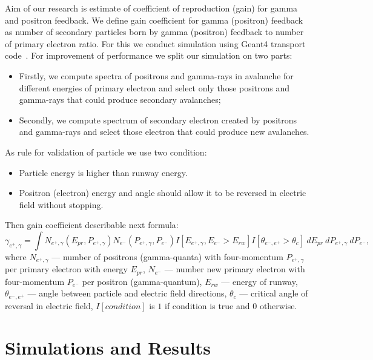 \documentclass{webofc}
\begin{document}
    
    Aim of our research is estimate of coefficient of reproduction (gain) for gamma and positron feedback. We define gain coefficient for gamma (positron) feedback as number of secondary particles born by gamma (positron) feedback to number of primary electron  ratio. For this we conduct simulation using Geant4 transport code~\cite{ALLISON2016186}. For improvement of performance we split our simulation on two parts:
    \begin{itemize}
        \item Firstly, we compute spectra of positrons and gamma-rays in avalanche for different energies of primary electron and select only those positrons and gamma-rays that could produce secondary avalanches;
        \item Secondly, we compute spectrum of secondary electron created by positrons and gamma-rays and select those electron that could produce new avalanches.
    \end{itemize}
    As rule for validation of particle we use two condition:
    \begin{itemize}
        \item Particle energy is higher than runway energy.
        \item Positron (electron) energy and angle should allow it to be reversed in electric field without stopping.
    \end{itemize}
    Then gain coefficient describable next formula:
    \begin{equation}
    \label{eq-gain}
    \gamma_{e^+, \gamma} = \int N_{e^+, \gamma}(E_{pr},P_{e^+, \gamma}) 
    N_{e^-}(P_{e^+, \gamma}, P_{e^-})
    I[E_{e^+, \gamma}, E_{e^-} > E_{rw}] I[\theta_{e^-, e^+} > \theta_{c}]
    ~dE_{pr}~dP_{e^+, \gamma}~dP_{e^-},
    \end{equation}
    where $N_{e^+, \gamma}$ --- number of positrons (gamma-quanta) with four-momentum $P_{e^+, \gamma}$ per primary electron with energy $E_{pr}$, $N_{e^-}$ --- number new primary electron with four-momentum $P_{e^-}$ per positron (gamma-quantum), $E_{rw}$ --- energy of runway, $\theta_{e^-, e^+}$ --- angle between particle and electric field directions, $\theta_c$ --- critical angle of reversal in electric field,   $I[condition]$ is $1$ if condition is true and $0$ otherwise.
    \section{Simulations and Results}
    
    
    
\end{document}
